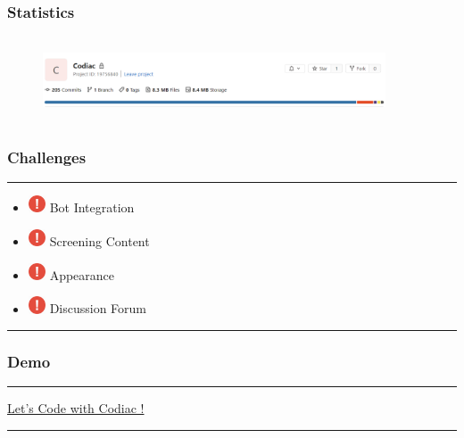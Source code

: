 \documentclass[14pt]{beamer}
\begin{document}
\begin{frame}
      \frametitle{Statistics}
        \begin{figure}[htbp]
        \centerline{\includegraphics[width=4in, height=1in]{./Codiac/logos/commits.png}}
  \end{figure}
\end{frame}


\begin{frame}
    \frametitle{Challenges}
    \noindent
    {\color{pink} \rule{\linewidth}{0.7mm} }
    \begin{itemize}
    \item [] \includegraphics[width=0.2in, height=0.2in]{./Codiac/logos/exclamation.png} Bot Integration\\
        
    \item [] \includegraphics[width=0.2in, height=0.2in]{./Codiac/logos/exclamation.png} Screening Content\\
                
    \item [] \includegraphics[width=0.2in, height=0.2in]{./Codiac/logos/exclamation.png} Appearance\\
            \item [] \includegraphics[width=0.2in, height=0.2in]{./Codiac/logos/exclamation.png} Discussion Forum\\
\end{itemize}
\noindent
    {\color{pink} \rule{\linewidth}{0.7mm} }
\end{frame}

\begin{frame}
     \frametitle{Demo}
       {\color{dr} \rule{\linewidth}{0.7mm}}
       \linebreak
        \linebreak
        \centerline
        {\huge \color{dr}
        \href{https://codiac-codenow.herokuapp.com}{Let's Code with Codiac !}}
        \linebreak
     {\color{dr} \rule{\linewidth}{0.7mm}}
  \end{frame}
\end{document}
